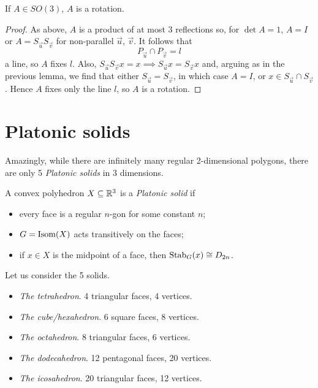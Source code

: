 \documentclass{../template/note}
\begin{document}
    \begin{lemma}[Elements of \(SO(3)\)]
        If \(A \in SO(3)\), \(A\) is a rotation.
    \end{lemma}
    
    \begin{proof}
        As above, \(A\) is a product of at most \(3\) reflections so, for \(\det A = 1\), \(A = I\) or \(A = S_{\vec u}S_{\vec v}\) for non-parallel \(\vec u\), \(\vec v\). It follows that
        \[
            P_{\vec u} \cap P_{\vec v} = l
        \]
        a line, so \(A\) fixes \(l\). Also, \(S_{\vec u}S_{\vec v}x = x \implies S_{\vec u}x = S_{\vec v}x\) and, arguing as in the previous lemma, we find that either \(S_{\vec u} = S_{\vec v}\), in which case \(A = I\), or \(x \in S_{\vec u} \cap S_{\vec v}\). Hence \(A\) fixes only the line \(l\), so \(A\) is a rotation.
    \end{proof}
    

    \section{Platonic solids}

    Amazingly, while there are infinitely many regular 2-dimensional polygons, there are only 5 \emph{Platonic solids} in 3 dimensions.

    \begin{definition}
        A convex polyhedron \(X \subseteq \mathbb R^3\) is a \emph{Platonic solid} if
        \begin{itemize}
            \item every face is a regular \(n\)-gon for some constant \(n\);
            \item \(G = \operatorname{Isom}(X)\) acts transitively on the faces;
            \item if \(x \in X\) is the midpoint of a face, then \(\operatorname{Stab}_G(x) \cong D_{2n}\).
        \end{itemize}
    \end{definition}
    
    Let us consider the 5 solids.

    \begin{itemize}
        \item \emph{The tetrahedron}. 4 triangular faces, 4 vertices.
        \item \emph{The cube/hexahedron}. 6 square faces, 8 vertices.
        \item \emph{The octahedron}. 8 triangular faces, 6 vertices.
        \item \emph{The dodecahedron}. 12 pentagonal faces, 20 vertices.
        \item \emph{The icosahedron}. 20 triangular faces, 12 vertices.
    \end{itemize}
    
\end{document}
